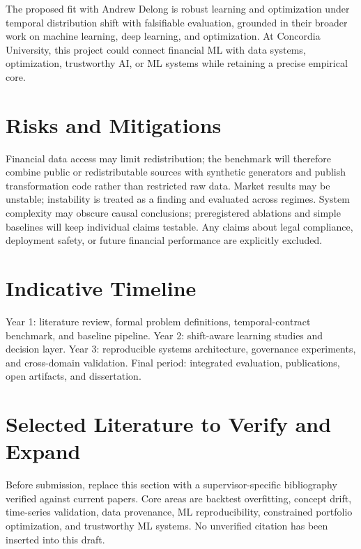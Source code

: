 \documentclass[11pt]{article}
\begin{document}
The proposed fit with Andrew Delong is robust learning and optimization under temporal distribution shift with falsifiable evaluation, grounded in their broader work on machine learning, deep learning, and optimization. At Concordia University, this project could connect financial ML with data systems, optimization, trustworthy AI, or ML systems while retaining a precise empirical core.

\section*{Risks and Mitigations}
Financial data access may limit redistribution; the benchmark will therefore combine public or redistributable sources with synthetic generators and publish transformation code rather than restricted raw data. Market results may be unstable; instability is treated as a finding and evaluated across regimes. System complexity may obscure causal conclusions; preregistered ablations and simple baselines will keep individual claims testable. Any claims about legal compliance, deployment safety, or future financial performance are explicitly excluded.

\section*{Indicative Timeline}
Year 1: literature review, formal problem definitions, temporal-contract benchmark, and baseline pipeline. Year 2: shift-aware learning studies and decision layer. Year 3: reproducible systems architecture, governance experiments, and cross-domain validation. Final period: integrated evaluation, publications, open artifacts, and dissertation.

\section*{Selected Literature to Verify and Expand}
Before submission, replace this section with a supervisor-specific bibliography verified against current papers. Core areas are backtest overfitting, concept drift, time-series validation, data provenance, ML reproducibility, constrained portfolio optimization, and trustworthy ML systems. No unverified citation has been inserted into this draft.
\end{document}
